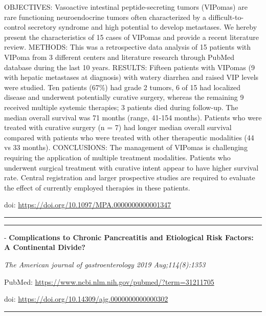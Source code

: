 \documentclass[]{article}
\begin{document}
OBJECTIVES: Vasoactive intestinal peptide-secreting tumors (VIPomas) are
rare functioning neuroendocrine tumors often characterized by a
difficult-to-control secretory syndrome and high potential to develop
metastases. We hereby present the characteristics of 15 cases of VIPomas
and provide a recent literature review. METHODS: This was a
retrospective data analysis of 15 patients with VIPoma from 3 different
centers and literature research through PubMed database during the last
10 years. RESULTS: Fifteen patients with VIPomas (9 with hepatic
metastases at diagnosis) with watery diarrhea and raised VIP levels were
studied. Ten patients (67\%) had grade 2 tumors, 6 of 15 had localized
disease and underwent potentially curative surgery, whereas the
remaining 9 received multiple systemic therapies; 3 patients died during
follow-up. The median overall survival was 71 months (range, 41-154
months). Patients who were treated with curative surgery (n = 7) had
longer median overall survival compared with patients who were treated
with other therapeutic modalities (44 vs 33 months). CONCLUSIONS: The
management of VIPomas is challenging requiring the application of
multiple treatment modalities. Patients who underwent surgical treatment
with curative intent appear to have higher survival rate. Central
registration and larger prospective studies are required to evaluate the
effect of currently employed therapies in these patients.

doi: \url{https://doi.org/10.1097/MPA.0000000000001347}

{}

{}

\begin{center}\rule{0.5\linewidth}{\linethickness}\end{center}

\begin{center}\rule{0.5\linewidth}{\linethickness}\end{center}

 - \textbf{Complications to Chronic Pancreatitis and Etiological Risk
Factors: A Continental Divide?}

\emph{The American journal of gastroenterology 2019 Aug;114(8):1353}

PubMed: \url{https://www.ncbi.nlm.nih.gov/pubmed/?term=31211705}

doi: \url{https://doi.org/10.14309/ajg.0000000000000302}

{}

{}

\begin{center}\rule{0.5\linewidth}{\linethickness}\end{center}
\end{document}
